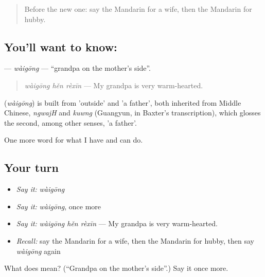 \label{lesson:ZH-C272-waigong}



\begin{quote}
Before the new one: say the Mandarin for a wife, then the Mandarin for hubby.
\end{quote}

\subsection*{You'll want to know: }
\textbf{} — \emph{wàigōng} — \textquotedblleft{}grandpa on the mother's side\textquotedblright{}.

\begin{quote}
\textbf{} \emph{wàigōng hěn rèxīn} — My grandpa is very warm-hearted.
\end{quote}

\begin{cousinweb}
\textbf{} (\emph{wàigōng}) is built from  'outside' and  'a father', both inherited from Middle Chinese, \emph{ngwajH} and \emph{kuwng} (Guangyun, in Baxter's transcription), which glosses the second, among other senses, 'a father'.
\end{cousinweb}

\begin{grammarlens}[title={What you've built}]
One more word for what I have and can do.
\end{grammarlens}

\subsection*{Your turn}
\begin{itemize}
\raggedright
  \item \emph{Say it:} \emph{wàigōng}
  \item \emph{Say it:} \emph{wàigōng}, once more
  \item \emph{Say it:} \emph{wàigōng hěn rèxīn} — My grandpa is very warm-hearted.
  \item \emph{Recall:} say the Mandarin for a wife, then the Mandarin for hubby, then say \emph{wàigōng} again
\end{itemize}

\begin{tcolorbox}[breakable,colback=teal!4,colframe=teal!35!black,title={Before you move on}]
What does  mean? (\textquotedblleft{}Grandpa on the mother's side\textquotedblright{}.) Say it once more.
\end{tcolorbox}

